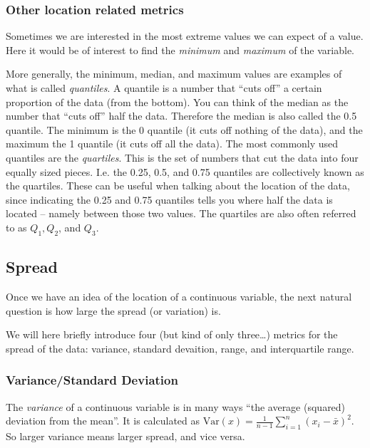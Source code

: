 \documentclass[]{book}
\theoremstyle{definition}
\theoremstyle{definition}
\theoremstyle{definition}
\theoremstyle{remark}
\begin{document}
\hypertarget{other-location-related-metrics}{%
\subsubsection{Other location related metrics}\label{other-location-related-metrics}}

Sometimes we are interested in the most extreme values we can expect of a value. Here it would be of interest to find the \emph{minimum} and \emph{maximum} of the variable.

More generally, the minimum, median, and maximum values are examples of what is called \emph{quantiles}. A quantile is a number that ``cuts off'' a certain proportion of the data (from the bottom). You can think of the median as the number that ``cuts off'' half the data. Therefore the median is also called the 0.5 quantile. The minimum is the 0 quantile (it cuts off nothing of the data), and the maximum the 1 quantile (it cuts off all the data). The most commonly used quantiles are the \emph{quartiles}. This is the set of numbers that cut the data into four equally sized pieces. I.e. the 0.25, 0.5, and 0.75 quantiles are collectively known as the quartiles. These can be useful when talking about the location of the data, since indicating the 0.25 and 0.75 quantiles tells you where half the data is located -- namely between those two values. The quartiles are also often referred to as \(Q_1, Q_2\), and \(Q_3\).

\hypertarget{spread}{%
\subsection{Spread}\label{spread}}

Once we have an idea of the location of a continuous variable, the next natural question is how large the spread (or variation) is.

We will here briefly introduce four (but kind of only three\ldots) metrics for the spread of the data: variance, standard devaition, range, and interquartile range.

\hypertarget{variancestandard-deviation}{%
\subsubsection{Variance/Standard Deviation}\label{variancestandard-deviation}}

The \emph{variance} of a continuous variable is in many ways ``the average (squared) deviation from the mean''. It is calculated as \(\text{Var}(x) = \frac{1}{n-1} \sum_{i=1}^n (x_i - \bar{x})^2\). So larger variance means larger spread, and vice versa.
\end{document}

